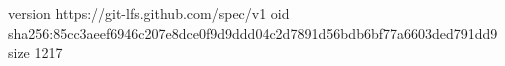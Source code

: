 version https://git-lfs.github.com/spec/v1
oid sha256:85cc3aeef6946c207e8dce0f9d9ddd04c2d7891d56bdb6bf77a6603ded791dd9
size 1217

